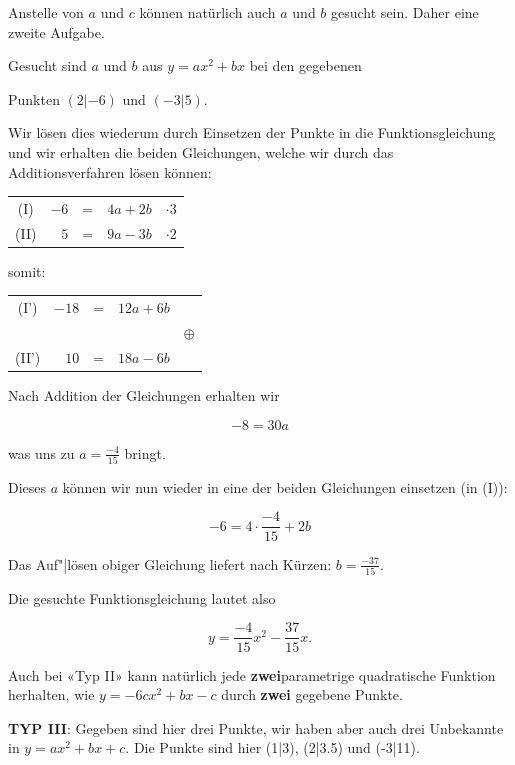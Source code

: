 \begin{beispiel}{}{}
  Anstelle von $a$ und $c$ können natürlich auch $a$ und $b$ gesucht
  sein. Daher eine zweite Aufgabe.

  Gesucht sind $a$ und $b$ aus $y = ax^2 + bx$ bei den gegebenen

  Punkten $(2|-6)$ und $(-3|5)$.

  Wir lösen dies wiederum durch Einsetzen der Punkte in die
  Funktionsgleichung und wir erhalten die beiden Gleichungen, welche
  wir durch das Additionsverfahren lösen können:

  \begin{tabular}{c | r  c  r | c}
    (I)  &  $-6$ & = & $4a + 2b$ & $\cdot{} 3$ \\
    (II) &   $5$ & = & $9a - 3b$ & $\cdot{} 2$ \\
  \end{tabular}

  somit:
  
  \begin{tabular}{c | r  c  r | c}
    (I')  & $-18$ & = & $12a + 6b$ &\, \\
     \,   & \,    & \,&   \,       & $\oplus$\\
    (II') &  $10$ & = & $18a - 6b$ &\, \\
  \end{tabular}

  Nach Addition der Gleichungen erhalten wir

  $$-8 = 30a$$

  was uns zu $a=\frac{-4}{15}$ bringt.

Dieses $a$ können wir nun wieder in eine der beiden Gleichungen
einsetzen (\zB in (I)):

$$-6=4\cdot{}\frac{-4}{15} + 2b$$

Das Auf"|lösen obiger Gleichung liefert nach Kürzen: $b=\frac{-37}{15}$.

Die gesuchte Funktionsgleichung lautet also

$$y = \frac{-4}{15} x^2 - \frac{37}{15} x.$$

\end{beispiel}

Auch bei «Typ II» kann natürlich jede \textbf{zwei}parametrige quadratische
Funktion herhalten, wie \zB $y=-6cx^2 + bx - c$ durch \textbf{zwei}
gegebene Punkte.
\newpage


\textbf{TYP III}: Gegeben sind hier drei Punkte, wir haben aber auch
drei Unbekannte in $y = ax^2 + bx + c$. Die Punkte sind hier
(1|3), (2|3.5) und (-3|11).

